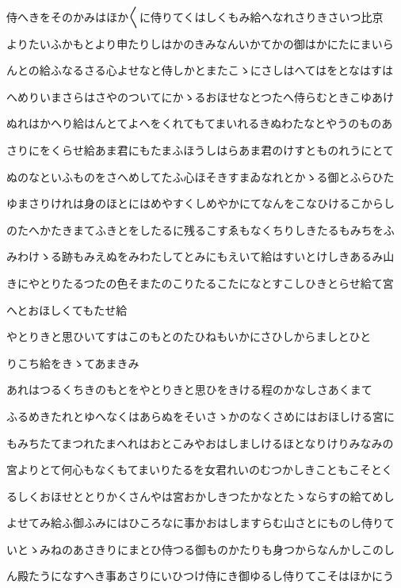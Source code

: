 \documentclass[a4paper,11pt,landscape]{ltjtarticle}
\begin{document}
侍へきをそのかみはほか〱に侍りてくはしくもみ給へなれさりきさいつ比京
\par\medskip
よりたいふかもとより申たりしはかのきみなんいかてかの御はかにたにまいら
\par\medskip
んとの給ふなるさる心よせなと侍しかとまたこゝにさしはへてはをとなはすは
\par\medskip
へめりいまさらはさやのついてにかゝるおほせなとつたへ侍らむときこゆあけ
\par\medskip
ぬれはかへり給はんとてよへをくれてもてまいれるきぬわたなとやうのものあ
\par\medskip
さりにをくらせ給あま君にもたまふほうしはらあま君のけすとものれうにとて
\par\medskip
ぬのなといふものをさへめしてたふ心ほそきすまゐなれとかゝる御とふらひた
\par\medskip
ゆまさりけれは身のほとにはめやすくしめやかにてなんをこなひけるこからし
\par\medskip
のたへかたきまてふきとをしたるに残るこすゑもなくちりしきたるもみちをふ
\par\medskip
みわけゝる跡もみえぬをみわたしてとみにもえいて給はすいとけしきあるみ山
\par\medskip
きにやとりたるつたの色そまたのこりたるこたになとすこしひきとらせ給て宮
\par\medskip
へとおほしくてもたせ給
\par\medskip
やとりきと思ひいてすはこのもとのたひねもいかにさひしからましとひと
\par\medskip
りこち給をきゝてあまきみ
\par\medskip
あれはつるくちきのもとをやとりきと思ひをきける程のかなしさあくまて
\par\medskip
ふるめきたれとゆへなくはあらぬをそいさゝかのなくさめにはおほしける宮に
\par\medskip
もみちたてまつれたまへれはおとこみやおはしましけるほとなりけりみなみの
\par\medskip
宮よりとて何心もなくもてまいりたるを女君れいのむつかしきこともこそとく
\par\medskip
るしくおほせととりかくさんやは宮おかしきつたかなとたゝならすの給てめし
\par\medskip
よせてみ給ふ御ふみにはひころなに事かおはしますらむ山さとにものし侍りて
\par\medskip
いとゝみねのあさきりにまとひ侍つる御ものかたりも身つからなんかしこのし
\par\medskip
ん殿たうになすへき事あさりにいひつけ侍にき御ゆるし侍りてこそはほかにう
\par\medskip
\end{document}
